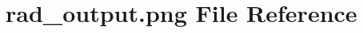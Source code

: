 \hypertarget{rad__output_8png}{}\section{rad\+\_\+output.\+png File Reference}
\label{rad__output_8png}
